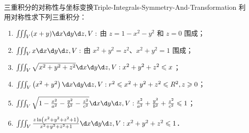 \begin{problem}{三重积分的对称性与坐标变换}{Triple-Integrals-Symmetry-And-Transformation}
    利用对称性求下列三重积分：
    \begin{enumerate}
        \item $\iiint_{V} (x+y) \d x \d y \d z, V:$ 由 $z=1-x^{2}-y^{2}$ 和 $z=0$ 围成；
        \item $\iiint_{V} x \d x \d y \d z, V:$ 由 $x^{2}+y^{2}=z^{2}、x^{2}+y^{2}=1$ 围成；
        \item $\iiint_{V} \sqrt{x^{2}+y^{2}+z^{2}} \d x \d y \d z, V: x^{2}+y^{2}+z^{2} \leqslant x$；
        \item $\iiint_{V}\left(x^{2}+y^{2}\right) \d x \d y \d z, V: r^{2} \leqslant x^{2}+y^{2}+z^{2} \leqslant R^{2}, z \geqslant 0$；
        \item $\iiint_{V} \sqrt{1-\frac{x^{2}}{a^{2}}-\frac{y^{2}}{b^{2}}-\frac{z^{2}}{c^{2}}} \d x \d y \d z, V: \frac{x^{2}}{a^{2}}+\frac{y^{2}}{b^{2}}+\frac{z^{2}}{c^{2}} \leqslant 1$；
        \item $\iiint_{V} \frac{z \ln \left(x^{2}+y^{2}+z^{2}+1\right)}{x^{2}+y^{2}+z^{2}+1} \d x \d y \d z, V: x^{2}+y^{2}+z^{2} \leqslant 1$．
    \end{enumerate}
\end{problem}

